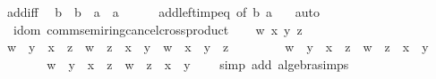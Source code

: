 \begin{isabellebody}
\isanewline
%
\endisadelimproof
\isanewline
{}\isamarkupfalse%
\ add{\isacharunderscore}{\kern0pt}{}{\isacharunderscore}{\kern0pt}iff{\isacharcolon}{\kern0pt}\isanewline
\ \ {\isachardoublequoteopen}b\ {\isacharequal}{\kern0pt}\ b\ {\isacharplus}{\kern0pt}\ a\ {\isasymlongleftrightarrow}\ a\ {\isacharequal}{\kern0pt}\ {}{\isachardoublequoteclose}\isanewline
%
\isadelimproof
\ \ %
\endisadelimproof
%
\isatagproof
{}\isamarkupfalse%
\ add{\isacharunderscore}{\kern0pt}left{\isacharunderscore}{\kern0pt}imp{\isacharunderscore}{\kern0pt}eq\ {\isacharbrackleft}{\kern0pt}of\ b\ a\ {}{\isacharbrackright}{\kern0pt}\ \isamarkupfalse%
\ auto%
\endisatagproof
{\isafoldproof}%
%
\isadelimproof
\isanewline
%
\endisadelimproof
\isanewline
{}\isamarkupfalse%
\isanewline
\isanewline
{}\isamarkupfalse%
\ {\isacharparenleft}{\kern0pt}\ idom{\isacharparenright}{\kern0pt}\ comm{\isacharunderscore}{\kern0pt}semiring{\isacharunderscore}{\kern0pt}{}{\isacharunderscore}{\kern0pt}cancel{\isacharunderscore}{\kern0pt}crossproduct\isanewline
%
\isadelimproof
%
\endisadelimproof
%
\isatagproof
{}\isamarkupfalse%
\isanewline
\ \ \isamarkupfalse%
\ w\ x\ y\ z\isanewline
\ \ \isamarkupfalse%
\ {\isachardoublequoteopen}w\ {\isacharasterisk}{\kern0pt}\ y\ {\isacharplus}{\kern0pt}\ x\ {\isacharasterisk}{\kern0pt}\ z\ {\isacharequal}{\kern0pt}\ w\ {\isacharasterisk}{\kern0pt}\ z\ {\isacharplus}{\kern0pt}\ x\ {\isacharasterisk}{\kern0pt}\ y\ {\isasymlongleftrightarrow}\ w\ {\isacharequal}{\kern0pt}\ x\ {\isasymor}\ y\ {\isacharequal}{\kern0pt}\ z{\isachardoublequoteclose}\isanewline
\ \ \isamarkupfalse%
\isanewline
\ \ \ \ \isamarkupfalse%
\ {\isachardoublequoteopen}w\ {\isacharasterisk}{\kern0pt}\ y\ {\isacharplus}{\kern0pt}\ x\ {\isacharasterisk}{\kern0pt}\ z\ {\isacharequal}{\kern0pt}\ w\ {\isacharasterisk}{\kern0pt}\ z\ {\isacharplus}{\kern0pt}\ x\ {\isacharasterisk}{\kern0pt}\ y{\isachardoublequoteclose}\isanewline
\ \ \ \ \isamarkupfalse%
\ \isamarkupfalse%
\ {\isachardoublequoteopen}w\ {\isacharasterisk}{\kern0pt}\ y\ {\isacharplus}{\kern0pt}\ x\ {\isacharasterisk}{\kern0pt}\ z\ {\isacharminus}{\kern0pt}\ w\ {\isacharasterisk}{\kern0pt}\ z\ {\isacharminus}{\kern0pt}\ x\ {\isacharasterisk}{\kern0pt}\ y\ {\isacharequal}{\kern0pt}\ {}{\isachardoublequoteclose}\ \isamarkupfalse%
\ {\isacharparenleft}{\kern0pt}simp\ add{\isacharcolon}{\kern0pt}\ algebra{\isacharunderscore}{\kern0pt}simps{\isacharparenright}{\kern0pt}\isanewline

\end{isabellebody}
